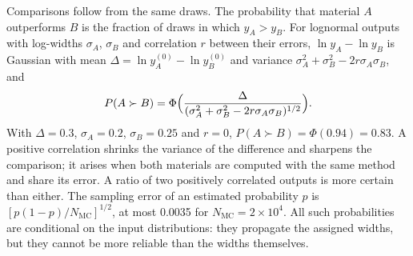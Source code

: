 Comparisons follow from the same draws. The probability that material $A$ outperforms $B$ is the fraction of draws in which $y_A > y_B$. For lognormal outputs with log-widths $\sigma_A$, $\sigma_B$ and correlation $r$ between their errors, $\ln y_A - \ln y_B$ is Gaussian with mean $\Delta = \ln y_A^{(0)} - \ln y_B^{(0)}$ and variance $\sigma_A^2 + \sigma_B^2 - 2r\sigma_A\sigma_B$, and
\begin{equation}
  P(A \succ B) = \Phi\Bigl(\frac{\Delta}{(\sigma_A^2 + \sigma_B^2 - 2r\sigma_A\sigma_B)^{1/2}}\Bigr) .
  \label{eq:C.14-pairwise}
\end{equation}
With $\Delta = 0.3$, $\sigma_A = 0.2$, $\sigma_B = 0.25$ and $r = 0$, $P(A \succ B) = \Phi(0.94) = 0.83$. A positive correlation shrinks the variance of the difference and sharpens the comparison; it arises when both materials are computed with the same method and share its error. A ratio of two positively correlated outputs is more certain than either. The sampling error of an estimated probability $p$ is $[p(1 - p)/N_{\mathrm{MC}}]^{1/2}$, at most 0.0035 for $N_{\mathrm{MC}} = 2\times10^4$. All such probabilities are conditional on the input distributions: they propagate the assigned widths, but they cannot be more reliable than the widths themselves.
